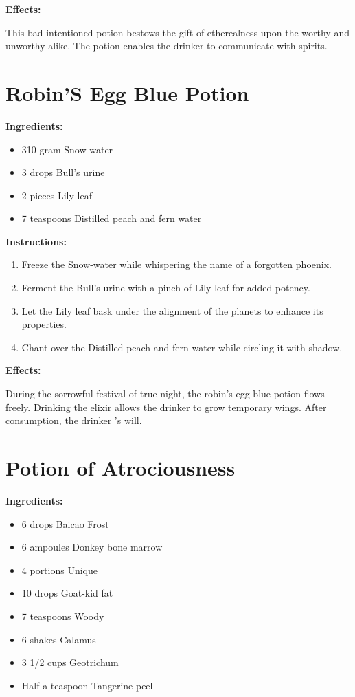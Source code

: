 \documentclass{article}
\begin{document}
\textbf{Effects:}

This bad-intentioned potion bestows the gift of etherealness upon the worthy and unworthy alike. The potion enables the drinker to communicate with spirits.

\newpage
\section*{Robin'S Egg Blue Potion}

\textbf{Ingredients:}

\begin{itemize}
  \item 310 gram Snow-water
  \item 3 drops Bull's urine
  \item 2 pieces Lily leaf
  \item 7 teaspoons Distilled peach and fern water
\end{itemize}

\textbf{Instructions:}

\begin{enumerate}
  \item Freeze the Snow-water while whispering the name of a forgotten phoenix.
  \item Ferment the Bull's urine with a pinch of Lily leaf for added potency.
  \item Let the Lily leaf bask under the alignment of the planets to enhance its properties.
  \item Chant over the Distilled peach and fern water while circling it with shadow.
\end{enumerate}

\textbf{Effects:}

During the sorrowful festival of true night, the robin's egg blue potion flows freely. Drinking the elixir allows the drinker to grow temporary wings. After consumption, the drinker 's will.

\newpage
\section*{Potion of Atrociousness}

\textbf{Ingredients:}

\begin{itemize}
  \item 6 drops Baicao Frost
  \item 6 ampoules Donkey bone marrow
  \item 4 portions Unique
  \item 10 drops Goat-kid fat
  \item 7 teaspoons Woody
  \item 6 shakes Calamus
  \item 3 1/2 cups Geotrichum
  \item Half a teaspoon Tangerine peel
\end{itemize}
\end{document}
